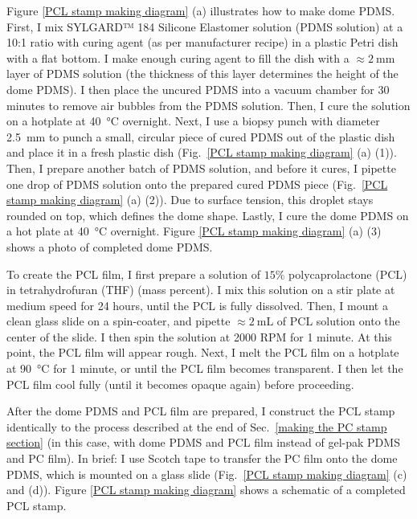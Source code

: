 \documentclass[double,12pt,1in,seploa]{beavtex}
\begin{document}
Figure \ref{PCL stamp making diagram} (a) illustrates how to make dome PDMS. First, I mix SYLGARD™ 184 Silicone Elastomer solution (PDMS solution) at a 10:1 ratio with curing agent (as per manufacturer recipe) in a plastic Petri dish with a flat bottom. I make enough curing agent to fill the dish with a $\approx \SI{2}{\milli\meter}$ layer of PDMS solution (the thickness of this layer determines the height of the dome PDMS). I then place the uncured PDMS into a vacuum chamber for 30 minutes to remove air bubbles from the PDMS solution. Then, I cure the solution on a hotplate at \SI{40}{\celsius} overnight. Next, I use a biopsy punch with diameter \SI{2.5}{\milli\meter} to punch a small, circular piece of cured PDMS out of the plastic dish and place it in a fresh plastic dish (Fig.\ \ref{PCL stamp making diagram} (a) (1)). Then, I prepare another batch of PDMS solution, and before it cures, I pipette one drop of PDMS solution onto the prepared cured PDMS piece (Fig.\ \ref{PCL stamp making diagram} (a) (2)). Due to surface tension, this droplet stays rounded on top, which defines the dome shape. Lastly, I cure the dome PDMS on a hot plate at \SI{40}{\celsius} overnight. Figure \ref{PCL stamp making diagram} (a) (3) shows a photo of completed dome PDMS.

To create the PCL film, I first prepare a solution of $15 \%$ polycaprolactone (PCL) in tetrahydrofuran (THF) (mass percent). I mix this solution on a stir plate at medium speed for 24  hours, until the PCL is fully dissolved. Then, I mount a clean glass slide on a spin-coater, and pipette $\approx \SI{2}{\milli\liter}$ of PCL solution onto the center of the slide. I then spin the solution at 2000 RPM for 1 minute. At this point, the PCL film will appear rough. Next, I melt the PCL film on a hotplate at \SI{90}{\celsius} for 1 minute, or until the PCL film becomes transparent. I then let the PCL film cool fully (until it becomes opaque again) before proceeding.

After the dome PDMS and PCL film are prepared, I construct the PCL stamp identically to the process described at the end of Sec.\ \ref{making the PC stamp section} (in this case, with dome PDMS and PCL film instead of gel-pak PDMS and PC film). In brief: I use Scotch tape to transfer the PC film onto the dome PDMS, which is mounted on a glass slide (Fig.\ \ref{PCL stamp making diagram} (c) and (d)). Figure \ref{PCL stamp making diagram} shows a schematic of a completed PCL stamp.
\end{document}
